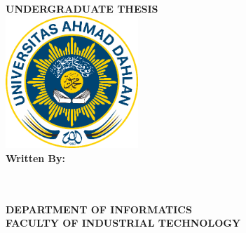 
\newpage
{}
\begin{center}
        \textbf{\Large{\judulen}}\\[2cm]
        \textbf{\large{\MakeUppercase{undergraduate thesis}}}\\[2.0cm]

        \includegraphics[width=5cm, height=5cm]{gambar/logo-uad.png}\\[1.5cm]

        \normalsize{\textbf{Written By:}} \\[0.5cm]
        \normalsize{\MakeUppercase{{\penulis}}} \\
        \normalsize{{\nim}}\\

        \vfill

        \textbf{\large{\MakeUppercase{DEPARTMENT OF INFORMATICS}}}\\
        \textbf{\large{\MakeUppercase{FACULTY OF INDUSTRIAL TECHNOLOGY}}}\\
        \textbf{\large{\MakeUppercase{\universitas}}}\\[1cm]
        \textbf{\large{\the\year{}}}\\
\end{center}
